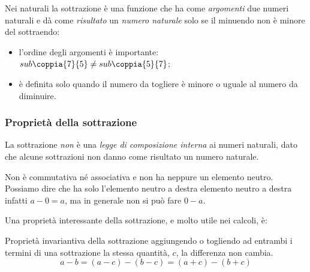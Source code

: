 Nei naturali la sottrazione è una funzione che ha come 
\emph{argomenti} due numeri naturali e dà come \emph{risultato} un 
\emph{numero naturale} solo se il minuendo non è minore del sottraendo:

\vspace{.5em}

\begin{osservazioni}{}{}
\begin{itemize} [nosep]
\item l'ordine degli argomenti è importante: 
\(sub \coppia{7}{5} \neq sub \coppia{5}{7}\);
\item è definita solo quando il numero da togliere è 
minore o uguale al numero da diminuire.
\end{itemize}
\end{osservazioni}

\subsubsection{Proprietà della sottrazione}

La sottrazione \emph{non} è una \emph{legge di composizione 
interna} ai numeri naturali, dato che alcune sottrazioni 
non danno come risultato un numero naturale.

Non è commutativa né associativa e non ha neppure un elemento neutro.
Possiamo dire che ha solo l'elemento neutro a destra
{elemento neutro a destra} infatti \(a - 0 = a\), ma in generale non si 
può fare \(0 - a\).

Una proprietà interessante della sottrazione, e molto utile nei calcoli, è:

\begin{teorema}{Proprietà invariantiva della sottrazione}{}
aggiungendo o togliendo ad entrambi i termini 
di una sottrazione la stessa quantità, \(c\), 
la differenza non cambia.
\[a - b = (a - c) - (b - c) = (a + c) - (b + c)\]
\end{teorema}



